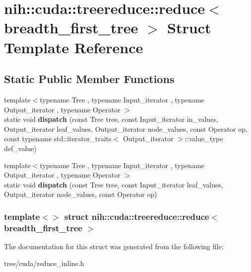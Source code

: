 \hypertarget{structnih_1_1cuda_1_1treereduce_1_1reduce_3_01breadth__first__tree_01_4}{
\section{nih\-:\-:cuda\-:\-:treereduce\-:\-:reduce$<$ breadth\-\_\-first\-\_\-tree $>$ \-Struct \-Template \-Reference}
\label{structnih_1_1cuda_1_1treereduce_1_1reduce_3_01breadth__first__tree_01_4}
}
\subsection*{\-Static \-Public \-Member \-Functions}
\begin{DoxyCompactItemize}
\item 
\hypertarget{structnih_1_1cuda_1_1treereduce_1_1reduce_3_01breadth__first__tree_01_4_ac1e6681e368fab2d922f9437cb0943a2}{
{\footnotesize template$<$typename Tree , typename Input\-\_\-iterator , typename Output\-\_\-iterator , typename Operator $>$ }\\static void {\bfseries dispatch} (const \-Tree tree, const \-Input\-\_\-iterator in\-\_\-values, \-Output\-\_\-iterator leaf\-\_\-values, \-Output\-\_\-iterator node\-\_\-values, const \-Operator op, const typename std\-::iterator\-\_\-traits$<$ \-Output\-\_\-iterator $>$\-::value\-\_\-type def\-\_\-value)}
\label{structnih_1_1cuda_1_1treereduce_1_1reduce_3_01breadth__first__tree_01_4_ac1e6681e368fab2d922f9437cb0943a2}

\item 
\hypertarget{structnih_1_1cuda_1_1treereduce_1_1reduce_3_01breadth__first__tree_01_4_a58629a837caf48b1519b85fae3c18051}{
{\footnotesize template$<$typename Tree , typename Input\-\_\-iterator , typename Output\-\_\-iterator , typename Operator $>$ }\\static void {\bfseries dispatch} (const \-Tree tree, const \-Input\-\_\-iterator leaf\-\_\-values, \-Output\-\_\-iterator node\-\_\-values, const \-Operator op)}
\label{structnih_1_1cuda_1_1treereduce_1_1reduce_3_01breadth__first__tree_01_4_a58629a837caf48b1519b85fae3c18051}

\end{DoxyCompactItemize}
\subsubsection*{template$<$$>$ struct nih\-::cuda\-::treereduce\-::reduce$<$ breadth\-\_\-first\-\_\-tree $>$}



\-The documentation for this struct was generated from the following file\-:\begin{DoxyCompactItemize}
\item 
tree/cuda/reduce\-\_\-inline.\-h\end{DoxyCompactItemize}

